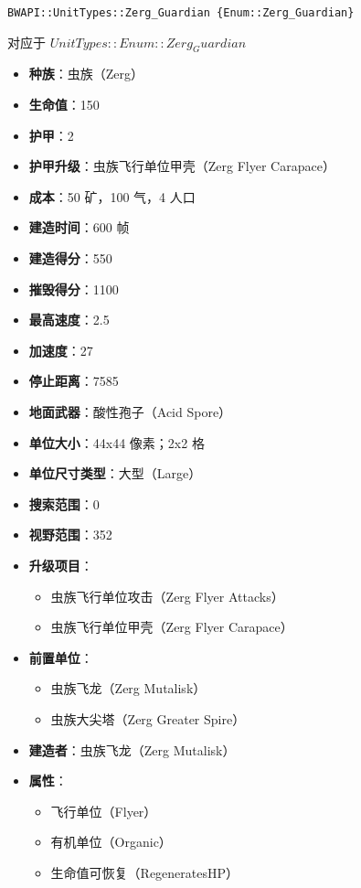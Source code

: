 \begin{tcolorbox}[colback=white, colframe=black!60!white, title=Zerg\_Guardian(), arc=0mm]
    \begin{verbatim}
BWAPI::UnitTypes::Zerg_Guardian {Enum::Zerg_Guardian}
    \end{verbatim}
    对应于  $ UnitTypes::Enum::Zerg_Guardian $ 
    \begin{itemize}
        \item \textbf{种族}：虫族（Zerg）
        \item \textbf{生命值}：150
        \item \textbf{护甲}：2
        \item \textbf{护甲升级}：虫族飞行单位甲壳（Zerg Flyer Carapace）
        \item \textbf{成本}：50 矿，100 气，4 人口
        \item \textbf{建造时间}：600 帧
        \item \textbf{建造得分}：550
        \item \textbf{摧毁得分}：1100
        \item \textbf{最高速度}：2.5
        \item \textbf{加速度}：27
        \item \textbf{停止距离}：7585
        \item \textbf{地面武器}：酸性孢子（Acid Spore）
        \item \textbf{单位大小}：44x44 像素；2x2 格
        \item \textbf{单位尺寸类型}：大型（Large）
        \item \textbf{搜索范围}：0
        \item \textbf{视野范围}：352
        \item \textbf{升级项目}：
            \begin{itemize}
                \item 虫族飞行单位攻击（Zerg Flyer Attacks）
                \item 虫族飞行单位甲壳（Zerg Flyer Carapace）
            \end{itemize}
        \item \textbf{前置单位}：
            \begin{itemize}
                \item 虫族飞龙（Zerg Mutalisk）
                \item 虫族大尖塔（Zerg Greater Spire）
            \end{itemize}
        \item \textbf{建造者}：虫族飞龙（Zerg Mutalisk）
        \item \textbf{属性}：
            \begin{itemize}
                \item 飞行单位（Flyer）
                \item 有机单位（Organic）
                \item 生命值可恢复（RegeneratesHP）
            \end{itemize}
    \end{itemize}
\end{tcolorbox}

